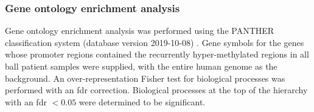 \subsubsection{Gene ontology enrichment analysis}

Gene ontology enrichment analysis was performed using the PANTHER classification system (database version 2019-10-08) \cite{miLargescaleGeneFunction2013}.
Gene symbols for the genes whose promoter regions contained the recurrently hyper-methylated regions in all \gls{ball} patient samples were supplied, with the entire human genome as the background.
An over-representation Fisher test for biological processes was performed with an \gls{fdr} correction.
Biological processes at the top of the hierarchy with an \gls{fdr} $< 0.05$ were determined to be significant.
